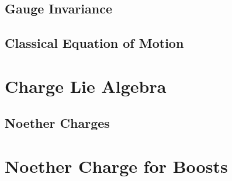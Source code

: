 \documentclass[12pt]{article}
\begin{document}
\subsection{Gauge Invariance}

\subsection{Classical Equation of Motion}

\section{Charge Lie Algebra}

\subsection{Noether Charges}

\section{Noether Charge for Boosts}
\end{document}

